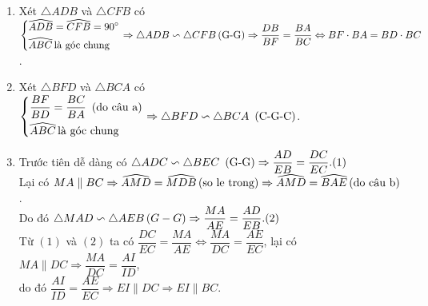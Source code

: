 \begin{ex}
{\begin{center}
\begin{tikzpicture}[line cap=round,line join=round, >=stealth,scale=1]
			
			\end{tikzpicture}
		\end{center}
		\begin{enumerate}
			\item Xét $\triangle ADB$ và $\triangle CFB$ có\\
			$\heva{&\widehat{ADB}=\widehat{CFB}=90^{\circ}\\&\widehat{ABC} \, \text{là góc chung} } \Rightarrow \triangle ADB \backsim \triangle CFB \text{\,(G-G)} \Rightarrow \dfrac{DB}{BF}=\dfrac{BA}{BC} \Leftrightarrow BF\cdot BA=BD\cdot BC$.
			\item  Xét $\triangle BFD$ và $\triangle BCA$ có\\
			$\heva{&\dfrac{BF}{BD}=\dfrac{BC}{BA}\text{\, (do câu a)}\\&\widehat{ABC}\, \text{là góc chung}} \Rightarrow \triangle BFD \backsim \triangle BCA \text{\, (C-G-C)} $.
			\item Trước tiên dễ dàng có $\triangle ADC \backsim \triangle BEC\text{\, (G-G)} \Rightarrow\dfrac{AD}{EB}=\dfrac{DC}{EC}. \hfill{(1)} $\\ Lại có $MA \parallel BC \Rightarrow \widehat{AMD}=\widehat{MDB}\text{\,(so le trong)} \Rightarrow \widehat{AMD}=\widehat{BAE}\text{\,(do câu b)}$.\\ Do đó $\triangle MAD \backsim \triangle AEB\,\text(G-G) \Rightarrow \dfrac{MA}{AE}=\dfrac{AD}{EB}. \hfill{(2)}$ \\
			
			Từ $(1)$ và $(2)$ ta có $\dfrac{DC}{EC}=\dfrac{MA}{AE} \Leftrightarrow \dfrac{MA}{DC}=\dfrac{AE}{EC}$, lại có $MA \parallel DC \Rightarrow \dfrac{MA}{DC}=\dfrac{AI}{ID}$, \\do đó $\dfrac{AI}{ID}=\dfrac{AE}{EC} \Rightarrow EI \parallel DC \Rightarrow EI \parallel BC$.
		\end{enumerate}
	}
\end{ex}




